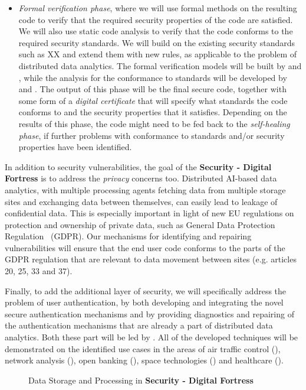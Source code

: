 \documentclass[a4paper,11pt]{article}
\newcommand{\project}[1]{\textbf{#1}\xspace}
\newcommand{\SECURITY}{\project{Security - Digital Fortress}}
\newcommand{\TheProject}{\SECURITY}
\begin{document}
\begin{itemize}
\item \emph{Formal verification phase}, where we will use formal methods on the resulting code to verify that the required security properties of the code are satisfied. We will also use static code analysis to verify that the code conforms to the required security standards. We will build on the existing security standards such as XX and extend them with new rules, as applicable to the problem of distributed data analytics. The formal verification models will be built by \SCCHshort{} and \SAshort{}, while the analysis for the conformance to standards will be developed by \UCMshort{} and \YAGshort{}. The output of this phase will be the final secure code, together with some form of a \emph{digital certificate} that will specify what standards the code conforms to and the security properties that it satisfies. Depending on the results of this phase, the code might need to be fed back to the \emph{self-healing phase}, if further problems with conformance to standards and/or security properties have been identified.
\end{itemize}

In addition to security vulnerabilities, the goal of the \TheProject{} is to address the \emph{privacy} concerns too. Distributed AI-based data analytics, with multiple processing agents fetching data from multiple storage sites and exchanging data between themselves, can easily lead to leakage of confidential data. This is especially important in light of new EU regulations on protection and ownership of private data, such as General Data Protection Regulation~\cite{gdpr} (GDPR). Our mechanisms for identifying and repairing vulnerabilities will ensure that the end user code conforms to the parts of the GDPR regulation that are relevant to data movement between sites (e.g. articles 20, 25, 33 and 37). 

Finally, to add the additional layer of security, we will specifically address the problem of user authentication, by both developing and integrating the novel secure authentication mechanisms and by providing diagnostics and repairing of the authentication mechanisms that are already a part of distributed data analytics. Both these part will be led by \COGNIshort{}. All of the developed techniques will be demonstrated on the identified use cases in the areas of air traffic control (\FRQshort{}), network analysis (\DEMshort{}), open banking (\SOPRAshort{}), space technologies (\SOPRAshort{}) and healthcare (\SOPRAshort{}). 


\begin{figure}[tp]
  \begin{center}
  \vspace{-5mm}
  \vspace{-1.5cm}
  \caption{Data Storage and Processing in \TheProject{}}
  \label{fig:storageprocessing}
  \end{center}
  \end{figure}
\end{document}
